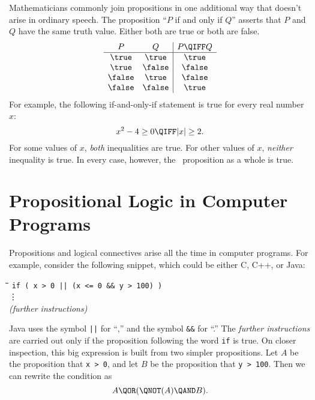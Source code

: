 Mathematicians commonly join propositions in one additional way that
doesn't arise in ordinary speech.  The proposition ``$P$ if and only
if $Q$'' asserts that $P$ and $Q$ have the same truth value.  Either
both are true or both are false.
%
\[
\begin{array}{cc|c}
P & Q & P \QIFF Q \\ \hline
\true & \true & \true \\
\true & \false & \false \\
\false & \true & \false \\
\false & \false & \true
\end{array}
\]
For example, the following if-and-only-if statement is true for every real
number $x$:
%
\[
x^2 - 4 \geq 0 \QIFF |x| \geq 2.
\]
%
For some values of $x$, \textit{both} inequalities are true.  For
other values of $x$, \textit{neither} inequality is true.  In every
case, however, the \QIFF\ proposition as a whole is true.

\begin{problems}

\practiceproblems
{}

\classproblems
{}

\homeworkproblems
{}
\end{problems}


\section{Propositional Logic in Computer Programs}\label{propositions_in_programs_sec}

Propositions and logical connectives arise all the time in computer
programs.  For example, consider the following snippet, which could be
either C, C++, or Java:
%
\begin{tabbing}
\hspace{1in} \= \quad\quad \= \quad\quad \= \quad\quad \= \kill
\> \texttt{if ( x > 0 || (x <= 0 \&\& y > 100) )} \\
\> \> \vdots\\
\> \textit{(further instructions)}
\end{tabbing}
%
Java uses the symbol \texttt{||} for ``\QOR,'' and the
symbol \texttt{\&\&} for ``\QAND.''  The \textit{further instructions}
are carried out only if the proposition following the word \texttt{if}
is true.  On closer inspection, this big expression is built from two
simpler propositions.  Let $A$ be the proposition that \texttt{x > 0},
and let $B$ be the proposition that \texttt{y > 100}.  Then we can
rewrite the condition as
\begin{equation}\label{ANAB}
A \QOR (\QNOT(A) \QAND B).
\end{equation}

